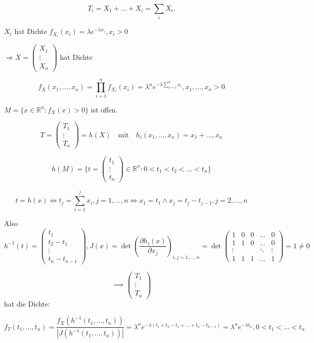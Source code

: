\documentclass[12pt, a4paper]{article}
\theoremstyle{plain}
\theoremstyle{definition}
\newcommand{\R}{\mathbb{R}}
\newcommand{\1}{\mathds{1}}
\providecommand{\mtext}[1]{\quad \text{#1} \quad}
\begin{document}
\[T_i = X_1+\dots+X_i = \sum_i X_i.\]

$X_i$ hat Dichte $f_{X_i}(x_i) = \lambda e^{-\lambda x_i}, x_i > 0$

\( \Rightarrow X = \begin{pmatrix}X_1\\\vdots\\X_n\end{pmatrix} \) hat Dichte 

\[f_X(x_1,\dots,x_n) = \prod_{i=1}^n f_{X_i}(x_i) = \lambda^n e^{-\lambda \sum_{i=1}^n x_i}, x_1,\dots,x_n > 0\]

\(M = \{x \in \R^n : f_X(x) > 0\}\) ist offen.

\[ T = \begin{pmatrix}T_1\\\vdots\\T_n\end{pmatrix} = h(X) \mtext{mit} h_i(x_1,\dots,x_n) = x_1+ \dots ,x_n \]

\[ h(M) = \{t = \begin{pmatrix}t_1\\ \vdots \\t_n\end{pmatrix} \in \R^n : 0 < t_1 < t_2 < \dots < t_n\} \]

\[ t = h(x) \Leftrightarrow t_j = \sum_{i=1}^j x_i , j=1,\dots,n \Leftrightarrow x_1 = t_1 \wedge x_j = t_j - t_{j-1} , j=2,\dots,n \]

Also \[h^{-1}(t) = \begin{pmatrix}t_1\\t_2-t_1\\\vdots\\t_n-t_{n-1}\end{pmatrix}, J(x) = \det\left(\frac{\partial h_i(x)}{\partial x_j}\right)_{i,j=1,\dots,n} = \det\begin{pmatrix}1&0&0&\dots&0\\1&1&0&\dots&0\\\vdots& & &\ddots&\vdots\\1&1&1&\dots&1\end{pmatrix} = 1 \neq 0 \]

\[\implies \begin{pmatrix}T_1\\\vdots\\T_n\end{pmatrix}\] hat die Dichte:

\[ f_T(t_1,\dots,t_n) = \frac{f_X(h^{-1}(t_1,\dots,t_n))}{|J(h^{-1}(t_1,\dots,t_n))|} = \lambda^n e^{-\lambda (t_1+t_2-t_1+\dots+t_n-t_{n-1})} = \lambda^n e^{-\lambda t_n} , 0<t_1<\dots<t_n \]
\end{document}
